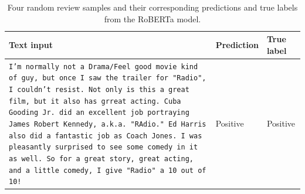 \begin{table}[h]
\caption{Four random review samples and their corresponding predictions and true labels from the RoBERTa model.}
\centering
\begin{tabularx}{\textwidth}{Xll}
Text input & Prediction & True label \\
\hline
 {\scriptsize \texttt{I'm normally not a Drama/Feel good movie kind of
guy, but once I saw the trailer for "Radio", I
couldn't resist. Not only is this a great film,
but it also has grreat acting. Cuba Gooding Jr.
did an excellent job portraying James Robert
Kennedy, a.k.a. "RAdio." Ed Harris also did a
fantastic job as Coach Jones. I was pleasantly
surprised to see some comedy in it as well. So for
a great story, great acting, and a little comedy,
I give "Radio" a 10 out of 10!} } &   Positive & Positive   \\
\hline


\end{tabularx}
\end{table}
